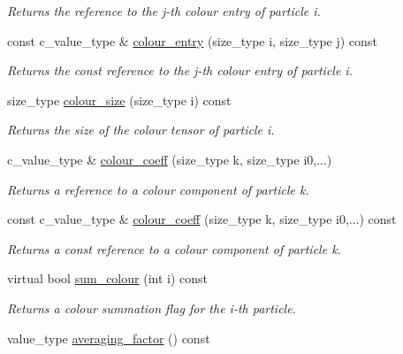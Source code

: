\begin{DoxyCompactItemize}
\begin{DoxyCompactList}\small\item\em Returns the reference to the j-\/th colour entry of particle i. \end{DoxyCompactList}\item 
\hypertarget{a00084_a92c40b47bb12145a8b61fb95064745cf}{const c\-\_\-value\-\_\-type \& \hyperlink{a00084_a92c40b47bb12145a8b61fb95064745cf}{colour\-\_\-entry} (size\-\_\-type i, size\-\_\-type j) const }\label{a00084_a92c40b47bb12145a8b61fb95064745cf}

\begin{DoxyCompactList}\small\item\em Returns the const reference to the j-\/th colour entry of particle i. \end{DoxyCompactList}\item 
\hypertarget{a00084_a65b02dcdd0beaab6882e9dbc6a848e43}{size\-\_\-type \hyperlink{a00084_a65b02dcdd0beaab6882e9dbc6a848e43}{colour\-\_\-size} (size\-\_\-type i) const }\label{a00084_a65b02dcdd0beaab6882e9dbc6a848e43}

\begin{DoxyCompactList}\small\item\em Returns the size of the colour tensor of particle i. \end{DoxyCompactList}\item 
\hypertarget{a00084_a8c3b86399c95c133ff909802e41774b0}{c\-\_\-value\-\_\-type \& \hyperlink{a00084_a8c3b86399c95c133ff909802e41774b0}{colour\-\_\-coeff} (size\-\_\-type k, size\-\_\-type i0,...)}\label{a00084_a8c3b86399c95c133ff909802e41774b0}

\begin{DoxyCompactList}\small\item\em Returns a reference to a colour component of particle k. \end{DoxyCompactList}\item 
\hypertarget{a00084_ad6909f5a1a768a62059fae53662bd33f}{const c\-\_\-value\-\_\-type \& \hyperlink{a00084_ad6909f5a1a768a62059fae53662bd33f}{colour\-\_\-coeff} (size\-\_\-type k, size\-\_\-type i0,...) const }\label{a00084_ad6909f5a1a768a62059fae53662bd33f}

\begin{DoxyCompactList}\small\item\em Returns a const reference to a colour component of particle k. \end{DoxyCompactList}\item 
virtual bool \hyperlink{a00084_afdc838af727810436248bc8e015910c1}{sum\-\_\-colour} (int i) const 
\begin{DoxyCompactList}\small\item\em Returns a colour summation flag for the i-\/th particle. \end{DoxyCompactList}\item 
\hypertarget{a00084_aa2740b4de29eb18a9056cdfe345bddcd}{value\-\_\-type \hyperlink{a00084_aa2740b4de29eb18a9056cdfe345bddcd}{averaging\-\_\-factor} () const }\label{a00084_aa2740b4de29eb18a9056cdfe345bddcd}


\end{DoxyCompactItemize}
